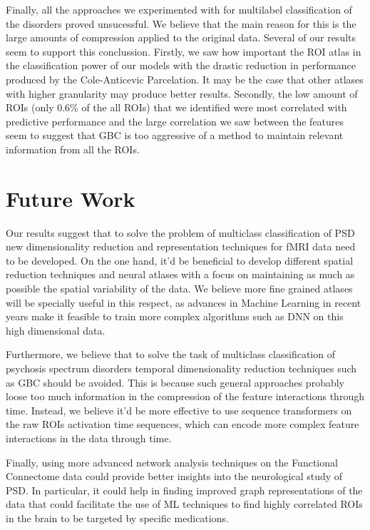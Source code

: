 \documentclass[fleqn,moreauthors,10pt]{ds_report}
\begin{document}
Finally, all the approaches we experimented with for multilabel classification of the disorders proved unsucessful. We believe that the main reason for this is the large amounts of compression applied to the original data. Several of our results seem to support this conclussion. Firstly, we saw how important the ROI atlas in the classification power of our models with the drastic reduction in performance produced by the Cole-Anticevic Parcelation. It may be the case that other atlases with higher granularity may produce better results. Secondly, the low amount of ROIs (only 0.6\% of the all ROIs) that we identified were most correlated with predictive performance and the large correlation we saw between the features seem to suggest that GBC is too aggressive of a method to maintain relevant information from all the ROIs. 

\section*{Future Work}
Our results suggest that to solve the problem of multiclass classification of PSD new dimensionality reduction and representation techniques for fMRI data need to be developed. On the one hand, it'd be beneficial to develop different spatial reduction techniques and neural atlases with a focus on maintaining as much as possible the spatial variability of the data. We believe more fine grained atlases will be specially useful in this respect, as advances in Machine Learning in recent years make it feasible to train more complex algorithms such as DNN on this high dimensional data. 

Furthermore, we believe that to solve the task of multiclass classification of psychosis spectrum disorders temporal dimensionality reduction techniques such as GBC should be avoided. This is because such general approaches probably loose too much information in the compression of the feature interactions through time. Instead, we believe it'd be more effective to use sequence transformers on the raw ROIs activation time sequences, which can encode more complex feature interactions in the data through time. 

Finally, using more advanced network analysis techniques on the Functional Connectome data could provide better insights into the neurological study of PSD. In particular, it could help in finding improved graph representations of the data that could facilitate the use of ML techniques to find highly correlated ROIs in the brain to be targeted by specific medications.





\end{document}

